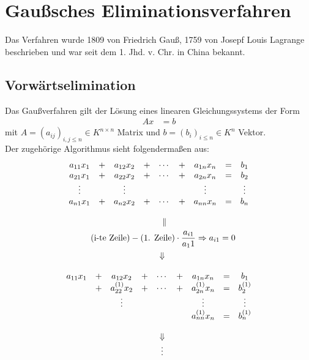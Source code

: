 \documentclass[ngerman,fontsize=11pt, paper=a4, parskip=false, titlepage=false, toc=bib]{scrbook}
\begin{document}
\section{Gaußsches Eliminationsverfahren} \label{2.1} 
Das Verfahren wurde 1809 von Friedrich Gauß, 1759 von Josepf Louis Lagrange beschrieben und war seit dem 1. Jhd. v. Chr. in China bekannt.

\subsection{Vorwärtselimination} \label{2.1.1}
Das Gaußverfahren gilt der Lösung eines linearen Gleichungssystems der Form
\begin{align*}
	Ax &= b
\end{align*}
mit $A=(a_{ij})_{i,j \leq n} \in K^{n\times n}$ Matrix und $b=(b_i)_{i\leq n} \in K^n$ Vektor.\\
Der zugehörige Algorithmus sieht folgendermaßen aus:
\begin{gather*}
	\begin{array}{ccccccccc}
	a_{11}x_1 &+& a_{12}x_2 &+& \cdots &+& a_{1n}x_n & = & b_1 \\
	a_{21}x_1 &+& a_{22}x_2 &+& \cdots &+& a_{2n}x_n & = & b_2 \\
	\vdots         &&        \vdots     &&              &&   \vdots       &    & \vdots \\
	a_{n1}x_1 &+& a_{n2}x_2 &+& \cdots &+& a_{nn}x_n & = & b_n \\\\
	&&&& \Arrowvert &&&& 
	\end{array} \\
\quad 	(\text{i-te Zeile}) - (\text{1. Zeile})\cdot \frac{a_{i1}}{a_11} \Rightarrow a_{i1}=0\\
\begin{array}{ccccccccc}
&&&& \Downarrow &&&&  \\\\
a_{11}x_1 &+& a_{12}x_2 &+& \cdots &+& a_{1n}x_n & = & b_1 \\
				  &+& a_{22}^{(1)}x_2 &+& \cdots &+& a_{2n}^{(1)}x_n & = & b_2^{(1)} \\
				 &&        \vdots     &&              &&   \vdots       &    & \vdots \\
														&& && && a_{nn}^{(1)}x_n & = & b_n^{(1)} \\\\
&&&& \Downarrow &&&&\\
&&&& \vdots &&&&
\end{array} 
\end{gather*}
\end{document}
